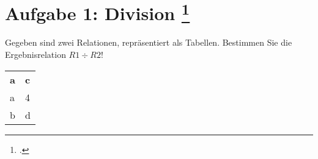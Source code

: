 \documentclass{lehramt-informatik-aufgabe}
\begin{document}

\section{Aufgabe 1: Division
\footcite{db:ab:4}}

Gegeben sind zwei Relationen, repräsentiert als Tabellen. Bestimmen Sie
die Ergebnisrelation $R1 \div R2$!

\begin{antwort}
\begin{tabular}{ll}
\textbf{a} & \textbf{c} \\
a & 4 \\
b & d
\end{tabular}
\end{antwort}
\end{document}
